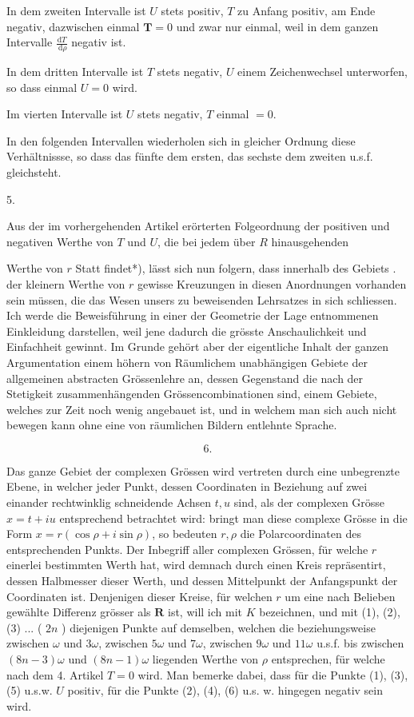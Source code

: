 \documentclass[10pt]{article}
\begin{document}
In dem zweiten Intervalle ist \(U\) stets positiv, \(T\) zu Anfang positiv, am Ende negativ, dazwischen einmal \(\boldsymbol{T}=0\) und zwar nur einmal, weil in dem ganzen Intervalle \(\frac{\mathrm{d} T}{\mathrm{~d} \rho}\) negativ ist.

In dem dritten Intervalle ist \(T\) stets negativ, \(U\) einem Zeichenwechsel unterworfen, so dass einmal \(U=0\) wird.

Im vierten Intervalle ist \(U\) stets negativ, \(T\) einmal \(=0\).

In den folgenden Intervallen wiederholen sich in gleicher Ordnung diese Verhältnissse, so dass das fünfte dem ersten, das sechste dem zweiten u.s.f. gleichsteht.

5.

Aus der im vorhergehenden Artikel erörterten Folgeordnung der positiven und negativen Werthe von \(T\) und \(U\), die bei jedem über \(R\) hinausgehenden

Werthe von \(r\) Statt findet*), lässt sich nun folgern, dass innerhalb des Gebiets . der kleinern Werthe von \(r\) gewisse Kreuzungen in diesen Anordnungen vorhanden sein müssen, die das Wesen unsers zu beweisenden Lehrsatzes in sich schliessen. Ich werde die Beweisführung in einer der Geometrie der Lage entnommenen Einkleidung darstellen, weil jene dadurch die grösste Anschaulichkeit und Einfachheit gewinnt. Im Grunde gehört aber der eigentliche Inhalt der ganzen Argumentation einem höhern von Räumlichem unabhängigen Gebiete der allgemeinen abstracten Grössenlehre an, dessen Gegenstand die nach der Stetigkeit zusammenhängenden Grössencombinationen sind, einem Gebiete, welches zur Zeit noch wenig angebauet ist, und in welchem man sich auch nicht bewegen kann ohne eine von räumlichen Bildern entlehnte Sprache.

\[
6 .
\]

Das ganze Gebiet der complexen Grössen wird vertreten durch eine unbegrenzte Ebene, in welcher jeder Punkt, dessen Coordinaten in Beziehung auf zwei einander rechtwinklig schneidende Achsen \(t, u\) sind, als der complexen Grösse \(x=t+i u\) entsprechend betrachtet wird: bringt man diese complexe Grösse in die Form \(x=r(\cos \rho+i \sin \rho)\), so bedeuten \(r, \rho\) die Polarcoordinaten des entsprechenden Punkts. Der Inbegriff aller complexen Grössen, für welche \(r\) einerlei bestimmten Werth hat, wird demnach durch einen Kreis repräsentirt, dessen Halbmesser dieser Werth, und dessen Mittelpunkt der Anfangspunkt der Coordinaten ist. Denjenigen dieser Kreise, für welchen \(r\) um eine nach Belieben gewählte Differenz grösser als \(\boldsymbol{R}\) ist, will ich mit \(K\) bezeichnen, und mit (1), (2), (3) ... ( \(2 n\) ) diejenigen Punkte auf demselben, welchen die beziehungsweise zwischen \(\omega\) und \(3 \omega\), zwischen \(5 \omega\) und \(7 \omega\), zwischen \(9 \omega\) und \(11 \omega\) u.s.f. bis zwischen \((8 n-3) \omega\) und \((8 n-1) \omega\) liegenden Werthe von \(\rho\) entsprechen, für welche nach dem 4. Artikel \(T=0\) wird. Man bemerke dabei, dass für die Punkte (1), (3), (5) u.s.w. \(U\) positiv, für die Punkte (2), (4), (6) u.s. w. hingegen negativ sein wird.
\end{document}

